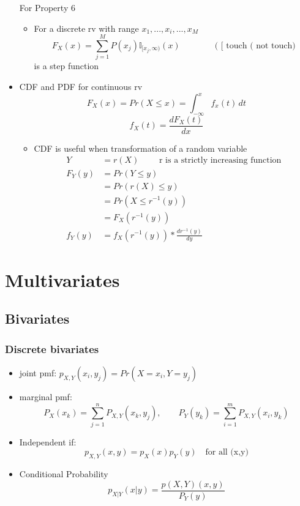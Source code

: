 \documentclass[12pt]{article}
\begin{document}
\begin{itemize}
\begin{enumerate}
\end{enumerate}
For Property 6
\begin{itemize}
\item For a discrete rv with range ${x_1,...,x_i,...,x_M}$
$$F_X(x) = \sum_{j=1}^M P(x_j) \mathbb{I}_{[x_j, \infty)}(x)  \qquad \qquad \textrm{( [ touch ( not touch)} $$  is a step function
\end{itemize}
\item CDF and PDF for continuous rv
$$F_X(x) = Pr(X \le x) = \int_{-\infty}^x f_x(t) \, dt$$
$$f_X(t) = \frac{dF_X(t)}{dx}$$
\begin{itemize}
\item CDF is useful when transformation of a random variable 
\begin{align*}
Y &= r(X) \quad \quad \textrm{   r is a strictly increasing function} \\
F_Y(y) &= Pr(Y \le y)\\
&= Pr(r(X) \le y)\\
&= Pr(X \le r^{-1}(y)) \\
&= F_X(r^{-1}(y)) \\
f_Y(y) &= f_X(r^{-1}(y)) * \frac{dr^{-1}(y)}{dy}
\end{align*}
\end{itemize}
\end{itemize}

\section{Multivariates}
\subsection{Bivariates}
\subsubsection{Discrete bivariates}
\begin{itemize}
\item joint pmf: $p_{X,Y}(x_i,y_j) = Pr(X=x_i, Y=y_j)$
\item marginal pmf: 
$$ P_X(x_k) = \sum_{j=1}^n P_{X,Y}(x_k,y_j), \qquad  P_Y(y_k) = \sum_{i=1}^m P_{X,Y}(x_i,y_k) $$ 
\item Independent if:
$$p_{X,Y}(x,y) = p_X(x)p_Y(y)\quad \textrm{for all (x,y)}$$ 
\item Conditional Probability 
$$p_{X|Y}(x|y)=\frac{p(X,Y)(x,y)}{P_Y(y)}$$
\end{itemize}
\end{document}
